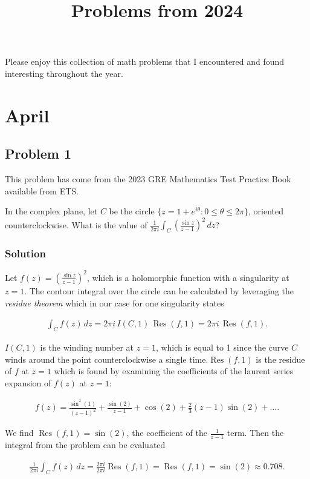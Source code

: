 \documentclass[12pt]{article}
\title{Problems from 2024}
\begin{document}
\maketitle

Please enjoy this collection of math problems that I encountered and found interesting throughout the year.

\setcounter{section}{3}
\section{April}

\subsection{Problem 1}

This problem has come from the 2023 GRE Mathematics Test Practice Book available from ETS.

In the complex plane, let $C$ be the circle $\{ z = 1 + e^{i\theta} : 0 \le \theta \le 2\pi\}$, oriented counterclockwise. What is the value of $\frac{1}{2 \pi i} \int_{C} \left( \frac{\sin z}{z - 1} \right)^2\,dz$?

\subsubsection*{Solution}

Let $f(z) = \left( \frac{\sin z}{z - 1} \right)^2$, which is a holomorphic function with a singularity at $z=1$. The contour integral over the circle can be calculated by leveraging the {\em{residue theorem}} which in our case for one singularity states

\begin{align}
  \int_{C} f(z)\, dz = 2 \pi i \, I(C,1) \, \operatorname{Res}(f,1) = 2 \pi i \, \operatorname{Res}(f,1).
\end{align}

$I(C,1)$ is the winding number at $z=1$, which is equal to 1 since the curve $C$ winds around the point counterclockwise a single time.$\operatorname{Res}(f,1)$ is the residue of $f$ at $z=1$ which is found by examining the coefficients of the laurent series expansion of $f(z)$ at $z = 1$:

\begin{align}
  f(z) =
  \frac{\sin^2(1)}{(z-1)^2} + \frac{\sin(2)}{z-1} + \cos(2) + \frac{2}{3}(z-1)\sin(2) + \dots.
\end{align}

We find $\operatorname{Res}(f,1) = \sin(2)$, the coefficient of the $\frac{1}{z-1}$ term.
Then the integral from the problem can be evaluated

\begin{align}
  \frac{1}{2 \pi i} \int_{C} f(z)\,dz
    = \frac{2 \pi i}{2 \pi i} \operatorname{Res}(f,1)
    = \operatorname{Res}(f,1)
    = \sin(2)
    \approx 0.708.
\end{align}
\end{document}
